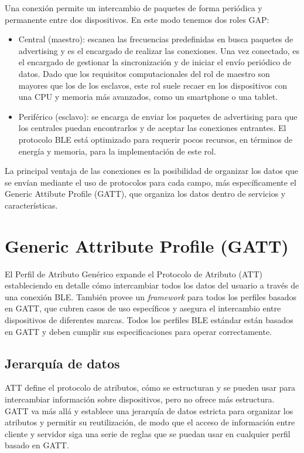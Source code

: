 Una conexión permite un intercambio de paquetes de forma periódica y permanente entre dos dispositivos. En este modo tenemos dos roles GAP:

\begin{itemize}
	\item Central (maestro): escanea las frecuencias predefinidas en busca paquetes de advertising y es el encargado de realizar las conexiones. Una vez conectado, es el encargado de gestionar la sincronización y de iniciar el envío periódico de datos. Dado que los requisitos computacionales del rol de maestro son mayores que los de los esclavos, este rol suele recaer en los dispositivos con una CPU y memoria más avanzados, como un smartphone o una tablet.

	\item Periférico (esclavo): se encarga de enviar los paquetes de advertising para que los centrales puedan encontrarlos y de aceptar las conexiones entrantes. El protocolo BLE está optimizado para requerir pocos recursos, en términos de energía y memoria, para la implementación de este rol.
\end{itemize}

La principal ventaja de las conexiones es la posibilidad de organizar los datos que se envían mediante el uso de protocolos para cada campo, más específicamente el Generic Attibute Profile (GATT), que organiza los datos dentro de servicios y características.

\section{Generic Attribute Profile (GATT)}
\label{makereference2.4}

El Perfil de Atributo Genérico expande el Protocolo de Atributo (ATT) estableciendo en detalle cómo intercambiar todos los datos del usuario a través de una conexión BLE. También provee un \textit{framework} para todos los perfiles basados en GATT, que cubren casos de uso específicos y asegura el intercambio entre dispositivos de diferentes marcas. Todos los perfiles BLE estándar están basados en GATT y deben cumplir sus especificaciones para operar correctamente.

\subsection{Jerarquía de datos}
\label{makereference2.4.1}

ATT define el protocolo de atributos, cómo se estructuran y se pueden usar para intercambiar información sobre dispositivos, pero no ofrece más estructura. GATT va más allá y establece una jerarquía de datos estricta para organizar los atributos y permitir su reutilización, de modo que el acceso de información entre cliente y servidor siga una serie de reglas que se puedan usar en cualquier perfil basado en GATT.

